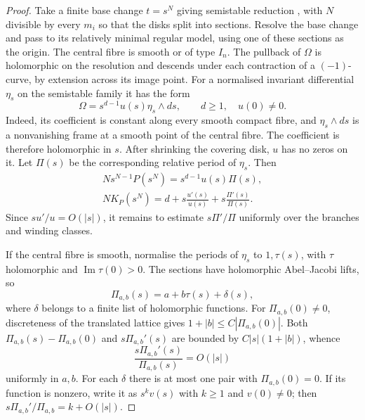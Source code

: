 \documentclass[a4paper]{amsart}
\renewcommand{\Im}{\operatorname{Im}}
\numberwithin{equation}{section}
\begin{document}
\begin{proof}
Take a finite base change $t=s^N$ giving semistable reduction
\cite[Section~5.2]{SS}, with $N$ divisible by every $m_i$ so that
the disks split into sections. Resolve the base change and pass to
its relatively minimal regular model, using one of these sections as
the origin. The central fibre is smooth or of type $I_n$. The pullback
of $\Omega$ is holomorphic on the resolution and descends under each
contraction of a $(-1)$-curve, by extension across its image point.
For a normalised invariant differential $\eta_s$ on the semistable
family it has the form
\[
 \Omega=s^{d-1}u(s)\eta_s\wedge ds,
 \qquad d\ge1,\quad u(0)\ne0.
\]
Indeed, its coefficient is constant along every smooth compact fibre,
and $\eta_s\wedge ds$ is a nonvanishing frame at a smooth point of
the central fibre. The coefficient is therefore holomorphic in $s$.
After shrinking the covering disk, $u$ has no zeros on it.
Let $\Pi(s)$ be the corresponding relative period of $\eta_s$. Then
\begin{equation}\label{eq:period-base-change}
\begin{gathered}
 Ns^{N-1}P(s^N)=s^{d-1}u(s)\Pi(s),\\
 NK_P(s^N)=d+s\frac{u'(s)}{u(s)}+s\frac{\Pi'(s)}{\Pi(s)}.
\end{gathered}
\end{equation}
Since $su'/u=O(|s|)$, it remains to estimate $s\Pi'/\Pi$ uniformly over
the branches and winding classes.

If the central fibre is smooth, normalise the periods of $\eta_s$
to $1,\tau(s)$, with $\tau$ holomorphic and $\Im\tau(0)>0$.
The sections have holomorphic Abel--Jacobi lifts, so
\[
 \Pi_{a,b}(s)=a+b\tau(s)+\delta(s),
\]
where $\delta$ belongs to a finite list of holomorphic functions.
For $\Pi_{a,b}(0)\ne0$, discreteness of the translated lattice gives
$1+|b|\le C|\Pi_{a,b}(0)|$. Both $\Pi_{a,b}(s)-\Pi_{a,b}(0)$ and
$s\Pi_{a,b}'(s)$ are bounded by $C|s|(1+|b|)$, whence
\[
 \frac{s\Pi_{a,b}'(s)}{\Pi_{a,b}(s)}=O(|s|)
\]
uniformly in $a,b$. For each $\delta$ there is at most one pair
with $\Pi_{a,b}(0)=0$. If its function is nonzero, write it as
$s^k v(s)$ with $k\ge1$ and $v(0)\ne0$; then
$s\Pi_{a,b}'/\Pi_{a,b}=k+O(|s|)$.


\end{proof}
\end{document}
